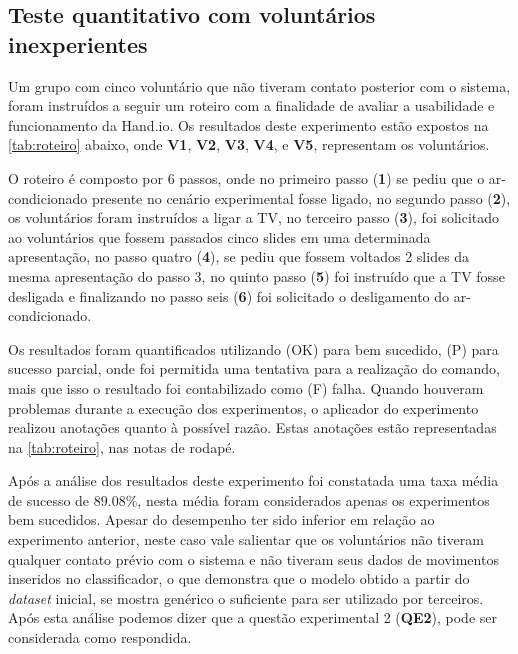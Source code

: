 
\subsection{Teste quantitativo com voluntários inexperientes}

Um grupo com cinco voluntário que não tiveram contato posterior com o sistema, foram instruídos a seguir um roteiro com a finalidade de avaliar a usabilidade e funcionamento da Hand.io. Os resultados deste experimento estão expostos na \autoref{tab:roteiro} abaixo, onde \textbf{V1}, \textbf{V2}, \textbf{V3}, \textbf{V4}, e \textbf{V5}, representam os voluntários. 

O roteiro é composto por 6 passos, onde no primeiro passo (\textbf{1}) se pediu que o ar-condicionado presente no cenário experimental fosse ligado, no segundo passo (\textbf{2}), os voluntários foram instruídos a ligar a TV, no terceiro passo (\textbf{3}), foi solicitado ao voluntários que fossem passados cinco slides em uma determinada apresentação, no passo quatro (\textbf{4}), se pediu que fossem voltados 2 slides da mesma apresentação do passo 3, no quinto passo (\textbf{5}) foi instruído que a TV fosse desligada e finalizando no passo seis (\textbf{6}) foi solicitado o desligamento do ar-condicionado.

Os resultados foram quantificados utilizando (OK) para bem sucedido, (P) para sucesso parcial, onde foi permitida uma tentativa para a realização do comando, mais que isso o resultado foi contabilizado como (F) falha. Quando houveram problemas durante a execução dos experimentos, o aplicador do experimento realizou anotações quanto à possível razão. Estas anotações estão representadas na \autoref{tab:roteiro}, nas notas de rodapé. 

Após a análise dos resultados deste experimento foi constatada uma taxa média de sucesso de $89.08\%$, nesta média foram considerados apenas os experimentos bem sucedidos. Apesar do desempenho ter sido inferior em relação ao experimento anterior, neste caso vale salientar que os voluntários não tiveram qualquer contato prévio com o sistema e não tiveram seus dados de movimentos inseridos no classificador, o que demonstra que o modelo obtido a partir do \textit{dataset} inicial, se mostra genérico o suficiente para ser utilizado por terceiros. Após esta análise podemos dizer que a questão experimental 2  (\textbf{QE2}), pode ser considerada como respondida.

